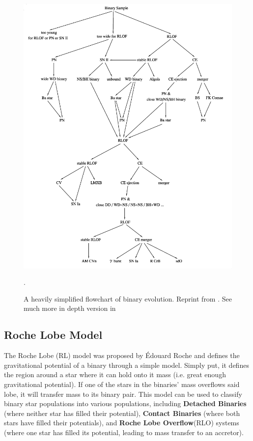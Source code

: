 \documentclass[12pt, a4paper]{article}
\begin{document}
    \vspace*{\fill}
    \begin{figure}[H]
        \centering
        \includegraphics[width=\textwidth]{figs/reused-figs/Han_BinaryEvolFlowchart.png}
        \caption{A heavily simplified flowchart of binary evolution. Reprint from \parencite{Han_2008}. See much more in depth version in \parencite{Chen_2024}}.
        \label{fig:binary_evolution_flowchart}
    \end{figure}
    \vspace*{\fill}
    \restoregeometry

    \subsection{Roche Lobe Model} \label{RLModel} %
        The Roche Lobe (RL) model was proposed by Édouard Roche and defines the gravitational potential of a binary through a simple model. Simply put, it defines the region around a star where it can hold onto it mass (i.e. great enough gravitational potential). If one of the stars in the binaries' mass overflows said lobe, it will transfer mass to its binary pair. This model can be used to classify binary star populations into various populations, including \textbf{Detached Binaries} (where neither star has filled their potential), \textbf{Contact Binaries} (where both stars have filled their potentials), and \textbf{Roche Lobe Overflow}(RLO) systems (where one star has filled its potential, leading to mass transfer to an accretor).
\end{document}
